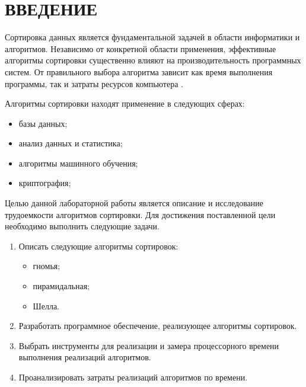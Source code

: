 \chapter*{ВВЕДЕНИЕ}

Сортировка данных является фундаментальной задачей в области информатики и алгоритмов. 
Независимо от конкретной области применения, эффективные алгоритмы сортировки существенно влияют на производительность программных систем. 
От правильного выбора алгоритма зависит как время выполнения программы, так и затраты ресурсов компьютера \cite{knut}.

Алгоритмы сортировки находят применение в следующих сферах:
\begin{itemize}
	\item базы данных;
	\item анализ данных и статистика;
	\item алгоритмы машинного обучения;
	\item криптография;
\end{itemize}

Целью данной лабораторной работы является описание и исследование трудоемкости алгоритмов сортировки.
Для достижения поставленной цели необходимо выполнить следующие задачи.

\begin{enumerate}
	\item Описать следующие алгоритмы сортировок: 
	\begin{itemize}
		\item гномья;
		\item пирамидальная;
		\item Шелла.
	\end{itemize}
	\item Разработать программное обеспечение, реализующее алгоритмы сортировок.
	\item Выбрать инструменты для реализации и замера процессорного времени
	выполнения реализаций алгоритмов.
	\item Проанализировать затраты реализаций алгоритмов по времени.
\end{enumerate}
